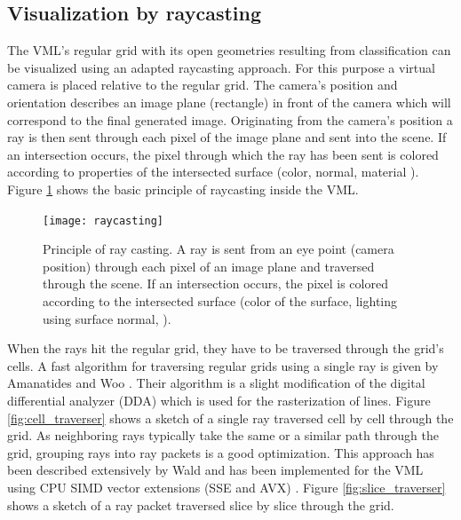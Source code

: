 \subsection{Visualization by raycasting}
\label{sec:raycasting}

The VML's regular grid with its open geometries resulting from classification can be visualized using an adapted raycasting approach.
For this purpose a virtual camera is placed relative to the regular grid.
The camera's position and orientation describes an image plane (rectangle) in front of the camera which will correspond to the final generated image.
Originating from the camera's position a ray is then sent through each pixel of the image plane and sent into the scene.
If an intersection occurs, the pixel through which the ray has been sent is colored according to properties of the intersected surface (color, normal, material \etc).
Figure \ref{fig:raycasting_principle} shows the basic principle of raycasting inside the VML.

\begin{figure}
	\centering
	\texttt{[image: raycasting]}
	\caption{
		Principle of ray casting.
		A ray is sent from an eye point (\ie camera position) through each pixel of an image plane and traversed through the scene.
		If an intersection occurs, the pixel is colored according to the intersected surface (\protect\eg color of the surface, lighting using surface normal, \protect\etc).
	}
	\label{fig:raycasting_principle}
\end{figure}

When the rays hit the regular grid, they have to be traversed through the grid's cells.
A fast algorithm for traversing regular grids using a single ray is given by Amanatides and Woo \cite{3DDDA}.
Their algorithm is a slight modification of the digital differential analyzer (DDA) which is used for the rasterization of lines.
Figure \ref{fig:cell_traverser} shows a sketch of a single ray traversed cell by cell through the grid.
%
As neighboring rays typically take the same or a similar path through the grid, grouping rays into ray packets is a good optimization.
This approach has been described extensively by Wald \etal \cite{packet_caster} and has been implemented for the VML using CPU SIMD vector extensions (SSE and AVX) \cite{enlight}.
Figure \ref{fig:slice_traverser} shows a sketch of a ray packet traversed slice by slice through the grid.

